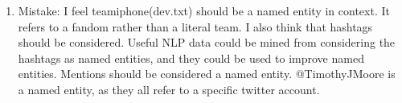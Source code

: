 \documentclass[twoside]{article}
\begin{document}
\begin{enumerate}
\newline
\newline
\item Mistake:
I feel teamiphone(dev.txt) should be a named entity in context. It refers to a fandom rather than a literal team. 
I also think that hashtags should be considered. Useful NLP data could be mined from considering the hashtags as named entities, and they could be used to improve named entities. 
Mentions should be considered a named entity. @TimothyJMoore is a named entity, as they all refer to a specific twitter account. 
\end{enumerate}
\end{document}
